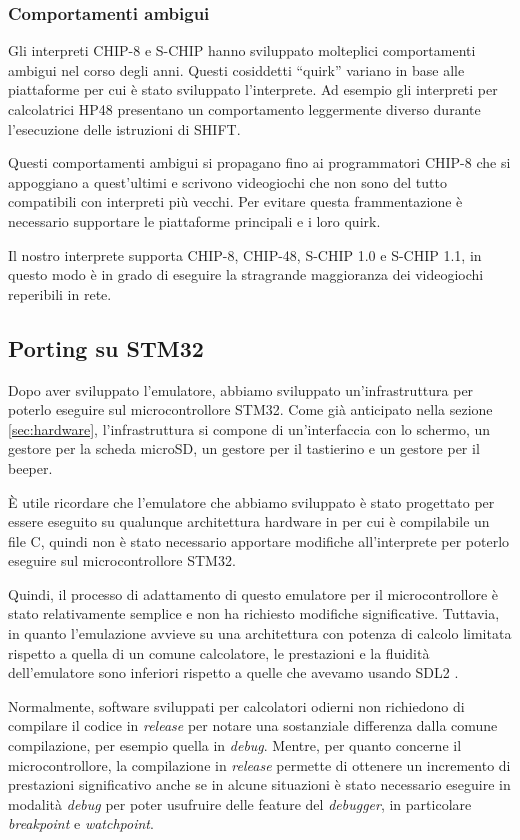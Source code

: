 \documentclass[a4paper]{article}
\begin{document}
\subsubsection{Comportamenti ambigui}

Gli interpreti CHIP-8 e S-CHIP hanno sviluppato molteplici comportamenti ambigui nel corso degli anni. Questi cosiddetti ``quirk'' variano in base alle piattaforme per cui è stato sviluppato l'interprete. Ad esempio gli interpreti per calcolatrici HP48 presentano un comportamento leggermente diverso durante l'esecuzione delle istruzioni di SHIFT.

Questi comportamenti ambigui si propagano fino ai programmatori
CHIP-8 che si appoggiano a quest'ultimi e scrivono videogiochi che
non sono del tutto compatibili con interpreti più vecchi. Per evitare
questa frammentazione è necessario supportare le piattaforme
principali e i loro quirk.

Il nostro interprete supporta CHIP-8, CHIP-48, S-CHIP 1.0 e
S-CHIP 1.1, in questo modo è in grado di eseguire la stragrande
maggioranza dei videogiochi reperibili in rete.

\subsection{Porting su STM32}

Dopo aver sviluppato l'emulatore, abbiamo sviluppato un'infrastruttura per poterlo eseguire sul microcontrollore STM32.
Come già anticipato nella sezione \ref{sec:hardware}, l'infrastruttura si compone di un'interfaccia con lo schermo, un gestore per la scheda microSD, un gestore per il tastierino e un gestore per il beeper.

È utile ricordare che l'emulatore che abbiamo sviluppato è stato progettato per essere eseguito su qualunque architettura hardware in per cui è compilabile un file C, quindi non è stato necessario apportare modifiche all'interprete per poterlo eseguire sul microcontrollore STM32.

Quindi, il processo di adattamento di questo emulatore per il microcontrollore è stato relativamente semplice e non ha richiesto modifiche significative. Tuttavia, in quanto l'emulazione avvieve su una architettura con potenza di calcolo limitata rispetto a quella di un comune calcolatore, le prestazioni e la fluidità dell'emulatore sono inferiori rispetto a quelle che avevamo usando SDL2 \cite{libsdl:about}.

Normalmente, software sviluppati per calcolatori odierni non richiedono di compilare il codice in \textit{release} per notare una sostanziale differenza dalla comune compilazione, per esempio quella in \textit{debug}. Mentre, per quanto concerne il microcontrollore, la compilazione in \textit{release} permette di ottenere un incremento di prestazioni significativo anche se in alcune situazioni è stato necessario eseguire in modalità \textit{debug} per poter usufruire delle feature del \textit{debugger}, in particolare \textit{breakpoint} e \textit{watchpoint}.
\end{document}
